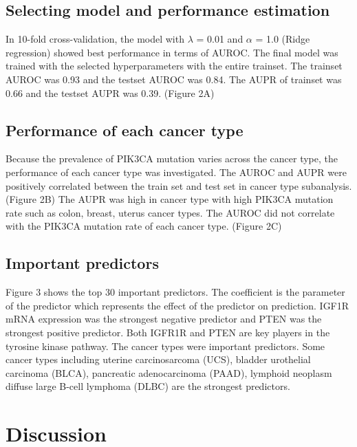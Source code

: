 \documentclass[10pt,letterpaper]{article}
\begin{document}
\hypertarget{selecting-model-and-performance-estimation}{%
\subsection{Selecting model and performance
estimation}\label{selecting-model-and-performance-estimation}}

In 10-fold cross-validation, the model with \(\lambda\) = 0.01 and
\(\alpha\) = 1.0 (Ridge regression) showed best performance in terms of
AUROC. The final model was trained with the selected hyperparameters
with the entire trainset. The trainset AUROC was 0.93 and the testset
AUROC was 0.84. The AUPR of trainset was 0.66 and the testset AUPR was
0.39. (Figure 2A)

\hypertarget{performance-of-each-cancer-type}{%
\subsection{Performance of each cancer
type}\label{performance-of-each-cancer-type}}

Because the prevalence of PIK3CA mutation varies across the cancer type,
the performance of each cancer type was investigated. The AUROC and AUPR
were positively correlated between the train set and test set in cancer
type subanalysis. (Figure 2B) The AUPR was high in cancer type with high
PIK3CA mutation rate such as colon, breast, uterus cancer types. The
AUROC did not correlate with the PIK3CA mutation rate of each cancer
type. (Figure 2C)

\hypertarget{important-predictors}{%
\subsection{Important predictors}\label{important-predictors}}

Figure 3 shows the top 30 important predictors. The coefficient is the
parameter of the predictor which represents the effect of the predictor
on prediction. IGF1R mRNA expression was the strongest negative
predictor and PTEN was the strongest positive predictor. Both IGFR1R and
PTEN are key players in the tyrosine kinase pathway. The cancer types
were important predictors. Some cancer types including uterine
carcinosarcoma (UCS), bladder urothelial carcinoma (BLCA), pancreatic
adenocarcinoma (PAAD), lymphoid neoplasm diffuse large B-cell lymphoma
(DLBC) are the strongest predictors.

\hypertarget{discussion}{%
\section{Discussion}\label{discussion}}
\end{document}
